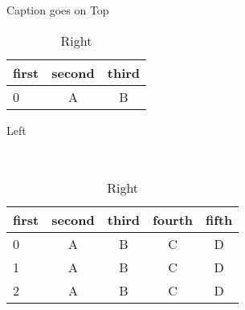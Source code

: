 \begin{table}

\renewcommand{\arraystretch}{1.2}
\setlength{\tabcolsep}{5pt}

\caption{Caption goes on Top}\label{tbl:tbl_side_by_side}

\begin{subtable}[b]{0.37\textwidth}
\centering
\begin{tabular}{lcc}
\toprule
first & second & third \\
\midrule
0 & A & B \\
\bottomrule
\end{tabular}
\caption{Left}\label{tbl:tbl_side_by_side:left}
\end{subtable}
%
\,
%
\begin{subtable}[b]{0.37\textwidth}
\centering
\begin{tabular}{lcccc}
\toprule
first & second & third & fourth & fifth \\
\midrule
0 & A & B & C & D \\
1 & A & B & C & D \\
2 & A & B & C & D \\
\bottomrule
\end{tabular}
\caption{Right}\label{tbl:tbl_side_by_side:right}
\end{subtable}

\end{table}